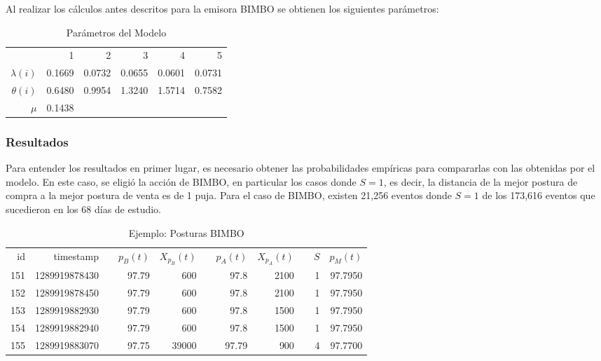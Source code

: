 \documentclass[11pt]{article}
\numberwithin{equation}{section} %
\begin{document}
Al realizar los cálculos antes descritos para la emisora BIMBO se obtienen los siguientes parámetros:

\begin{table}[htbp]
\centering
\caption{Parámetros del Modelo}
\begin{tabular}{r|r|r|r|r|r|}
\cline{2-6}
& 1& 2 & 3 & 4 & 5 \\
\cline{2-6}
$\lambda(i)$ & 0.1669 & 0.0732 & 0.0655 & 0.0601 & 0.0731 \\
$\theta(i)$ & 0.6480 & 0.9954 & 1.3240 & 1.5714 & 0.7582 \\
\cline{2-6}
$\mu$ & 0.1438 & & & & \\
\cline{2-6}
\end{tabular}%
\label{tab:paremeters}%
\end{table}%

\subsubsection{Resultados}

Para entender los resultados en primer lugar, es necesario obtener las probabilidades empíricas para compararlas con las obtenidas por el modelo. En este caso, se eligió la acción de BIMBO, en particular los casos donde $S=1$, es decir, la distancia de la mejor postura de compra a la mejor postura de venta es de 1 puja. Para el caso de BIMBO, existen 21,256 eventos donde $S=1$ de los 173,616 eventos que sucedieron en los 68 días de estudio.

\begin{table}[htbp]
  \centering
  \caption{Ejemplo: Posturas BIMBO}
    \begin{tabular}{rrrrrrrrrrr}
    id    & timestamp &       & $p_B(t)$    & $X_{p_B}(t)$ &       & $p_A(t)$    & $X_{p_A}(t)$   &       & $S$     & $p_M(t)$ \\
    151   & 1289919878430 &       & 97.79 & 600   &       & 97.8  & 2100  &       & 1  & 97.7950 \\
    152   & 1289919878450 &       & 97.79 & 600   &       & 97.8  & 2100  &       & 1  & 97.7950 \\
    153   & 1289919882930 &       & 97.79 & 600   &       & 97.8  & 1500  &       & 1  & 97.7950 \\
    154   & 1289919882940 &       & 97.79 & 600   &       & 97.8  & 1500  &       & 1  & 97.7950 \\
    155   & 1289919883070 &       & 97.75 & 39000 &       & 97.79 & 900   &       & 4  & 97.7700 \\
    \end{tabular}%
  \label{tab:bimbotab}%
\end{table}%
\end{document}
